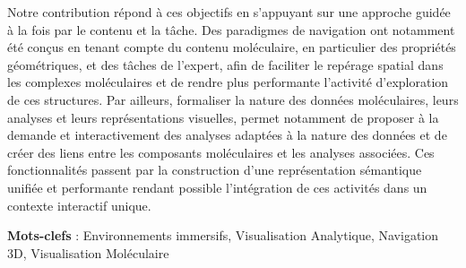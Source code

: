 Notre contribution répond à ces objectifs en s'appuyant sur une approche guidée à la fois par le contenu et la tâche. Des paradigmes de navigation ont notamment été conçus en tenant compte du contenu moléculaire, en particulier des propriétés géométriques, et des tâches de l'expert, afin de faciliter le repérage spatial dans les complexes moléculaires et de rendre plus performante l'activité d'exploration de ces structures. Par ailleurs, formaliser la nature des données moléculaires, leurs analyses et leurs représentations visuelles, permet notamment de proposer à la demande et interactivement des analyses adaptées à la nature des données et de créer des liens entre les composants moléculaires et les analyses associées. Ces fonctionnalités passent par la construction d'une représentation sémantique unifiée et performante rendant possible l'intégration de ces activités dans un contexte interactif unique.

\textbf{Mots-clefs} : Environnements immersifs, Visualisation Analytique, Navigation 3D, Visualisation Moléculaire


